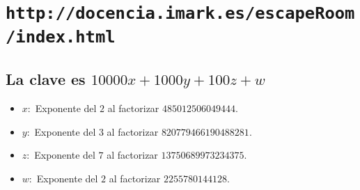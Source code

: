 \documentclass[a4paper,12pt]{article}
\begin{document}
\section*{\texttt{http://docencia.imark.es/escapeRoom/index.html}}
\subsection*{La clave es $10000x + 1000y + 100z +w$}
\begin{itemize}
	\item $x:$ Exponente del $2$ al factorizar $485012506049444$.
	\item $y:$ Exponente del $3$ al factorizar $820779466190488281$.
	\item $z:$ Exponente del $7$ al factorizar $13750689973234375$.
	\item $w:$ Exponente del $2$ al factorizar $2255780144128$.
\end{itemize}
\end{document}
